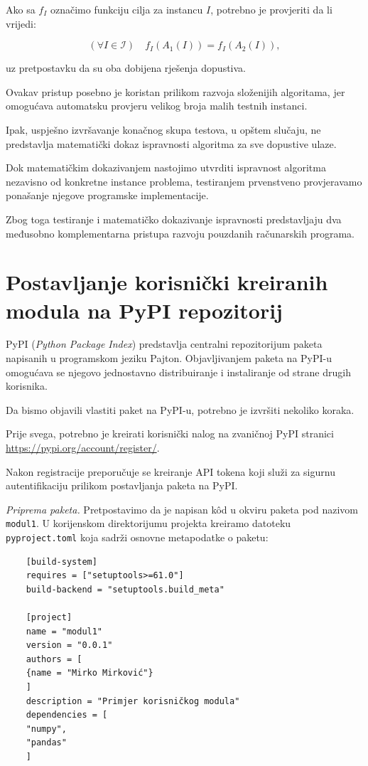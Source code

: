 Ako sa $f_I$ označimo funkciju cilja za instancu $I$, 
potrebno je provjeriti da li vrijedi:

\[
(\forall I\in\mathcal{I})\quad
f_I(A_1(I))=f_I(A_2(I)),
\]

uz pretpostavku da su oba dobijena rješenja dopustiva.

Ovakav pristup posebno je koristan prilikom razvoja 
složenijih algoritama, jer omogućava automatsku 
provjeru velikog broja malih testnih instanci.

Ipak, uspješno izvršavanje konačnog skupa testova, 
u opštem slučaju, ne predstavlja matematički dokaz 
ispravnosti algoritma za sve dopustive ulaze.

Dok matematičkim dokazivanjem nastojimo utvrditi 
ispravnost algoritma nezavisno od konkretne instance 
problema, testiranjem prvenstveno provjeravamo 
ponašanje njegove programske implementacije.

Zbog toga testiranje i matematičko dokazivanje 
ispravnosti predstavljaju dva međusobno 
komplementarna pristupa razvoju pouzdanih 
računarskih programa.

\section{Postavljanje korisnički kreiranih modula na PyPI repozitorij}

PyPI (\textit{Python Package Index}) predstavlja centralni repozitorijum paketa napisanih u programskom jeziku Pajton. Objavljivanjem paketa na PyPI-u omogućava se njegovo jednostavno distribuiranje i instaliranje od strane drugih korisnika.

Da bismo objavili vlastiti paket na PyPI-u, potrebno je izvršiti nekoliko koraka.

Prije svega, potrebno je kreirati korisnički nalog na zvaničnoj PyPI stranici \url{https://pypi.org/account/register/}. 


Nakon registracije preporučuje se kreiranje API tokena koji služi za sigurnu autentifikaciju prilikom postavljanja paketa na PyPI.

\textit{Priprema paketa.} Pretpostavimo da je napisan k\^od u okviru paketa pod nazivom \texttt{modul1}. U korijenskom direktorijumu projekta kreiramo datoteku \texttt{pyproject.toml} koja sadrži osnovne metapodatke o paketu:

\begin{verbatim}
	[build-system]
	requires = ["setuptools>=61.0"]
	build-backend = "setuptools.build_meta"
	
	[project]
	name = "modul1"
	version = "0.0.1"
	authors = [
	{name = "Mirko Mirković"}
	]
	description = "Primjer korisničkog modula"
	dependencies = [
	"numpy",
	"pandas"
	]
\end{verbatim}

